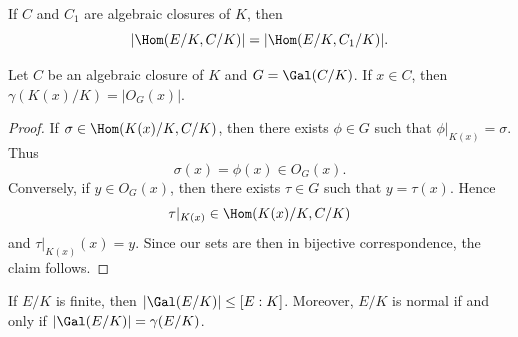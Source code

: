 \begin{exercise}
\label{xca:gamma_C}
    If $C$ and $C_1$ are algebraic closures of $K$, then
    \[
    |\Hom(E/K,C/K)|=|\Hom(E/K,C_1/K)|.
    \]
\end{exercise}

\begin{proposition}
\label{pro:gamma_orbit}
    Let $C$ be an algebraic closure of $K$ and $G=\Gal(C/K)$. 
    If $x\in C$, then $\gamma(K(x)/K)=|O_G(x)|$. 
\end{proposition}

\begin{proof}
    If $\sigma\in\Hom(K(x)/K,C/K)$, then there exists $\phi\in G$ such that
    $\phi|_{K(x)}=\sigma$. Thus 
    \[
    \sigma(x)=\phi(x)\in O_G(x).
    \]
    Conversely,
    if $y\in O_G(x)$, then there exists $\tau\in G$ such that
    $y=\tau(x)$. Hence 
    \[
    \tau|_{K(x)}\in\Hom(K(x)/K,C/K)
    \]
    and 
    $\tau|_{K(x)}(x)=y$. Since our sets are then in bijective correspondence, 
    the claim follows. 
\end{proof}


\begin{exercise}
If $E/K$ is finite, then $|\Gal(E/K)|\leq [E:K]$. Moreover, 
$E/K$ is normal if and only if $|\Gal(E/K)|=\gamma(E/K)$. 
\end{exercise}

